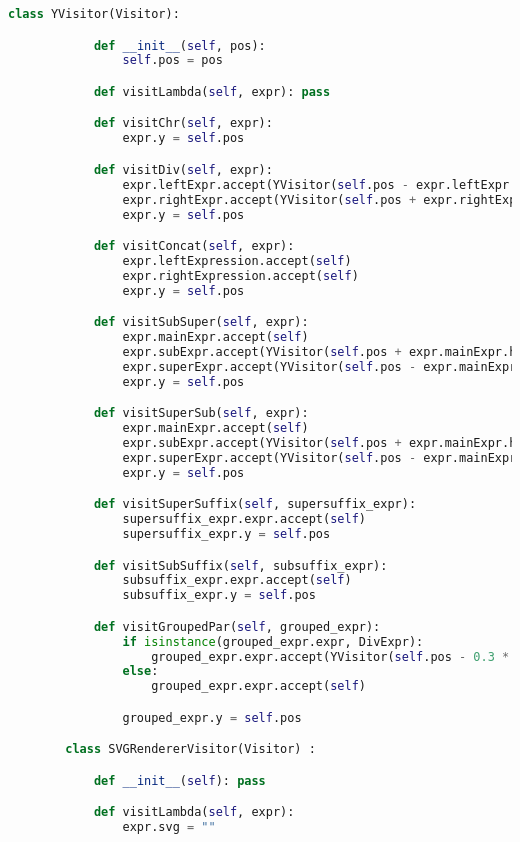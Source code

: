 \begin{lstlisting}[language=Python]
        class YVisitor(Visitor):

            def __init__(self, pos):
                self.pos = pos

            def visitLambda(self, expr): pass

            def visitChr(self, expr):
                expr.y = self.pos

            def visitDiv(self, expr):
                expr.leftExpr.accept(YVisitor(self.pos - expr.leftExpr.h2 - expr.e*0.6))
                expr.rightExpr.accept(YVisitor(self.pos + expr.rightExpr.h1 - expr.e*0.6))
                expr.y = self.pos

            def visitConcat(self, expr):
                expr.leftExpression.accept(self)
                expr.rightExpression.accept(self)
                expr.y = self.pos

            def visitSubSuper(self, expr):
                expr.mainExpr.accept(self)
                expr.subExpr.accept(YVisitor(self.pos + expr.mainExpr.h*0.25)) #parece ser la formula que usaron en el ejemplo del enunciado
                expr.superExpr.accept(YVisitor(self.pos - expr.mainExpr.h1*0.45)) #visto en clase
                expr.y = self.pos

            def visitSuperSub(self, expr):
                expr.mainExpr.accept(self)
                expr.subExpr.accept(YVisitor(self.pos + expr.mainExpr.h*0.25))
                expr.superExpr.accept(YVisitor(self.pos - expr.mainExpr.h1*0.45))
                expr.y = self.pos

            def visitSuperSuffix(self, supersuffix_expr):
                supersuffix_expr.expr.accept(self)
                supersuffix_expr.y = self.pos

            def visitSubSuffix(self, subsuffix_expr):
                subsuffix_expr.expr.accept(self)
                subsuffix_expr.y = self.pos

            def visitGroupedPar(self, grouped_expr):
                if isinstance(grouped_expr.expr, DivExpr):
                    grouped_expr.expr.accept(YVisitor(self.pos - 0.3 * grouped_expr.expr.e))
                else:
                    grouped_expr.expr.accept(self)

                grouped_expr.y = self.pos

        class SVGRendererVisitor(Visitor) :

            def __init__(self): pass

            def visitLambda(self, expr):
                expr.svg = ""


\end{lstlisting}
